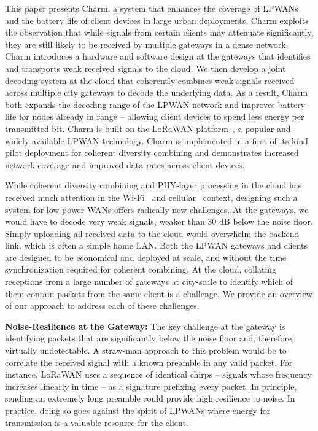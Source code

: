 This paper presents Charm, a system that enhances the coverage of LPWANs and
the battery life of client devices in large urban deployments. Charm exploits
the observation that while signals from certain clients may attenuate
significantly, they are still likely to be received by multiple gateways in a
dense network. Charm introduces a hardware and software design at the gateways
that identifies and transports weak received signals to the cloud. We then
develop a joint decoding system at the cloud that coherently combines weak
signals received across multiple city gateways to decode the underlying data.
As a result, Charm both expands the decoding range of the LPWAN network and
improves battery-life for nodes already in range -- allowing client devices to
spend less energy per transmitted bit. Charm is built on the LoRaWAN
platform~\cite{LoRaWanAlliance2015}, a popular and widely available LPWAN
technology. Charm is implemented in a first-of-its-kind pilot deployment for
coherent diversity combining and demonstrates increased network coverage and
improved data rates across client devices.

While coherent diversity combining and PHY-layer processing in the cloud has
received much attention in the Wi-Fi~\cite{tan2009sam, xie2014scalable} and
cellular~\cite{checko2015cloud, wubben2014benefits} context, designing such a
system for low-power WANs offers radically new challenges. At the gateways, we
would have to decode very weak signals, weaker than 30 dB below the noise
floor. Simply uploading all received data to the cloud would overwhelm
the backend link, which is often  a simple home LAN. Both the LPWAN gateways
and clients are designed to be economical and deployed at scale, and without
the time synchronization required for coherent combining. At the cloud,
collating receptions from a large number of gateways at city-scale to identify
which of them contain packets from the same client is a challenge. We provide
an overview of our approach to address each of these challenges.

\noindent \textbf{Noise-Resilience at the Gateway:} The key challenge at the
gateway is identifying packets that are significantly below the noise floor
and, therefore, virtually undetectable. A straw-man approach to this problem
would be to correlate the received signal with a known preamble in any valid
packet. For instance, LoRaWAN uses a sequence of identical chirps -- signals
whose frequency increases linearly in time -- as a signature prefixing every
packet. In principle, sending an extremely long preamble could provide high
resilience to noise. In practice, doing so goes against the spirit of LPWANs
where energy for transmission is a valuable resource for the client.

